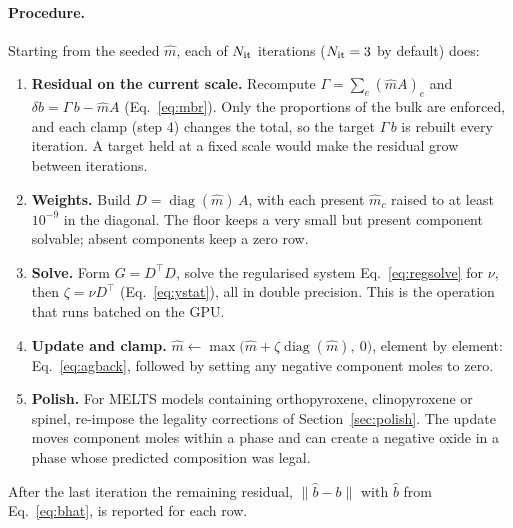 \documentclass[11pt]{article}
\begin{document}
\paragraph{Procedure.} Starting from the seeded $\hat m$, each of $N_{\rm it}$ iterations
($N_{\rm it} = 3$ by default) does:
\begin{enumerate}[nosep]
  \item \textbf{Residual on the current scale.} Recompute $\Gamma = \sum_e (\hat m A)_e$ and
        $\delta b = \Gamma\, b - \hat m A$ (Eq.~\ref{eq:mbr}). Only the proportions of the
        bulk are enforced, and each clamp (step 4) changes the total, so the target
        $\Gamma\, b$ is rebuilt every iteration. A target held at a fixed scale would make
        the residual grow between iterations.
  \item \textbf{Weights.} Build $D = \operatorname{diag}(\hat m)\,A$, with each present
        $\hat m_c$ raised to at least $10^{-9}$ in the diagonal. The floor keeps a very small
        but present component solvable; absent components keep a zero row.
  \item \textbf{Solve.} Form $G = D^{\!\top} D$, solve the regularised system
        Eq.~\eqref{eq:regsolve} for $\nu$, then $\zeta = \nu D^{\!\top}$
        (Eq.~\ref{eq:ystat}), all in double precision. This is the operation that runs
        batched on the GPU.
  \item \textbf{Update and clamp.} $\hat m \leftarrow \max\big(\hat m + \zeta \operatorname{diag}(\hat m),\ 0\big)$,
        element by element: Eq.~\eqref{eq:agback}, followed by setting any negative
        component moles to zero.
  \item \textbf{Polish.} For MELTS models containing orthopyroxene, clinopyroxene or spinel,
        re-impose the legality corrections of Section~\ref{sec:polish}. The update moves
        component moles within a phase and can create a negative oxide in a phase whose
        predicted composition was legal.
\end{enumerate}
After the last iteration the remaining residual, $\lVert \hat b - b \rVert$ with $\hat b$ from
Eq.~\eqref{eq:bhat}, is reported for each row.
\end{document}
